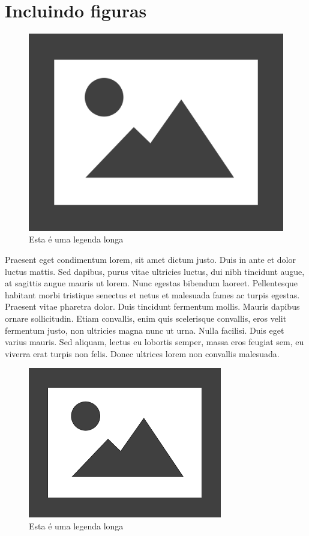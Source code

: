 \documentclass{article}
\begin{document}
\section*{Incluindo figuras}

\begin{figure}[H]
	\centering
	\includegraphics[width=0.5\linewidth]{Figuras/fig1}
	\caption[Legenda curta]{Esta é uma legenda longa}
	\label{fig:fig1}
\end{figure}

Praesent eget condimentum lorem, sit amet dictum justo. Duis in ante et dolor luctus mattis. Sed dapibus, purus vitae ultricies luctus, dui nibh tincidunt augue, at sagittis augue mauris ut lorem. Nunc egestas bibendum laoreet. Pellentesque habitant morbi tristique senectus et netus et malesuada fames ac turpis egestas. Praesent vitae pharetra dolor. Duis tincidunt fermentum mollis. Mauris dapibus ornare sollicitudin. Etiam convallis, enim quis scelerisque convallis, eros velit fermentum justo, non ultricies magna nunc ut urna. Nulla facilisi. Duis eget varius mauris. Sed aliquam, lectus eu lobortis semper, massa eros feugiat sem, eu viverra erat turpis non felis. Donec ultrices lorem non convallis malesuada.


\begin{figure}[H]  %
	\centering
	\includegraphics[width=0.5\linewidth]{Figuras/fig2}
	\caption[Legenda curta]{Esta é uma legenda longa}
	\label{fig:fig2}
\end{figure}
\end{document}
